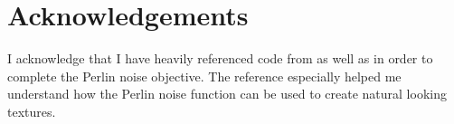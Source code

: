 \chapter*{Acknowledgements}

I acknowledge that I have heavily referenced code from \cite{9_perlin_2002} as 
well as \cite{7_kora_2007} in order to complete the Perlin noise objective. The 
reference especially helped me understand how the Perlin noise function can be
used to create natural looking textures.

